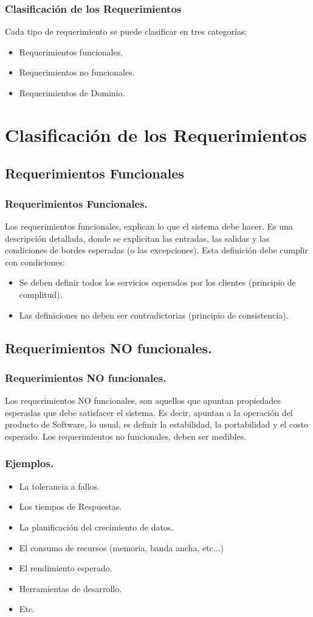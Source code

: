 \documentclass[12pt]{beamer}
\begin{document}
\begin{frame}
\frametitle{Clasificación de los Requerimientos}
Cada tipo de requerimiento se puede clasificar en tres categorías:
\begin{itemize}
 \item<2-> Requerimientos funcionales.
 \item<3-> Requerimientos no funcionales.
 \item<4-> Requerimientos de Dominio.
\end{itemize}
\end{frame}

\section{Clasificación de los Requerimientos}
\subsection{Requerimientos Funcionales}
\begin{frame}
\frametitle{Requerimientos Funcionales.}
Los requerimientos funcionales, explican lo que el sistema debe hacer. Es una descripción detallada, donde se explicitan las entradas, las salidas y las condiciones de bordes esperadas (o las excepciones). Esta definición debe cumplir con condiciones:
\begin{itemize}
 \item<2-> Se deben definir todos los servicios esperados por los clientes (principio de complitud).
 \item<3-> Las definiciones no deben ser contradictorias (principio de consistencia).
\end{itemize}
\end{frame}

\subsection{Requerimientos NO funcionales.}
\begin{frame}
\frametitle{Requerimientos NO funcionales.}
Los requerimientos NO funcionales, son aquellos que apuntan propiedades esperadas que debe satisfacer el sistema. Es decir, apuntan a la operación del producto de Software, lo usual, es definir la \alert{estabilidad}, la \alert{portabilidad} y el \alert{costo} esperado.
Los requerimientos no funcionales, deben ser medibles.
\end{frame}

\begin{frame}
\frametitle{Ejemplos.}
\begin{itemize}
 \item<2-> La tolerancia a fallos.
 \item<3-> Los tiempos de Respuestas.
 \item<4-> La planificación del crecimiento de datos.
 \item<5-> El consumo de recursos (memoria, banda ancha, etc...)
 \item<6-> El rendimiento esperado.
 \item<7-> Herramientas de desarrollo.
 \item<8->  Etc.
\end{itemize}
\end{frame}
\end{document}
